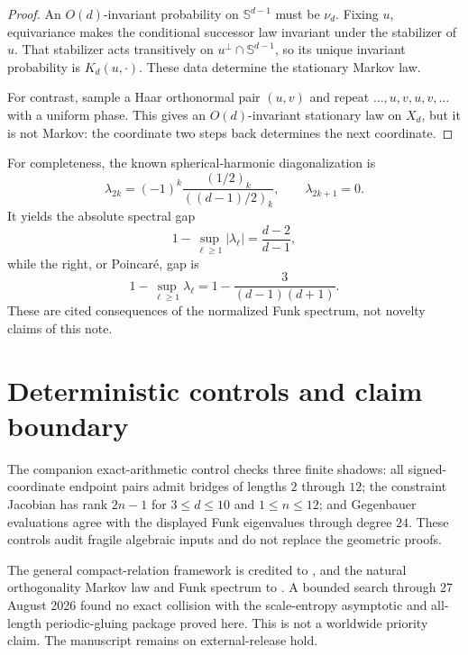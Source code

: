 \documentclass[11pt,a4paper]{amsart}
\theoremstyle{definition}
\theoremstyle{remark}
\newcommand{\Sphere}{\mathbb S}
\begin{document}
\begin{proof}
An $O(d)$-invariant probability on $\Sphere^{d-1}$ must be $\nu_d$.  Fixing
$u$, equivariance makes the conditional successor law invariant under the
stabilizer of $u$.  That stabilizer acts transitively on
$u^\perp\cap\Sphere^{d-1}$, so its unique invariant probability is
$K_d(u,\cdot)$.  These data determine the stationary Markov law.

For contrast, sample a Haar orthonormal pair $(u,v)$ and repeat
$\ldots,u,v,u,v,\ldots$ with a uniform phase.  This gives an $O(d)$-invariant
stationary law on $X_d$, but it is not Markov: the coordinate two steps back
determines the next coordinate.
\end{proof}

For completeness, the known spherical-harmonic diagonalization is
\[
 \lambda_{2k}=(-1)^k\frac{(1/2)_k}{((d-1)/2)_k},\qquad
 \lambda_{2k+1}=0.
\]
It yields the absolute spectral gap
\[
 1-\sup_{\ell\geq1}|\lambda_\ell|=\frac{d-2}{d-1},
\]
while the right, or Poincar\'e, gap is
\[
 1-\sup_{\ell\geq1}\lambda_\ell
 =1-\frac{3}{(d-1)(d+1)}.
\]
These are cited consequences of the normalized Funk spectrum, not novelty
claims of this note.

\section{Deterministic controls and claim boundary}

The companion exact-arithmetic control checks three finite shadows: all
signed-coordinate endpoint pairs admit bridges of lengths $2$ through $12$;
the constraint Jacobian has rank $2n-1$ for $3\leq d\leq10$ and
$1\leq n\leq12$; and Gegenbauer evaluations agree with the displayed Funk
eigenvalues through degree $24$.  These controls audit fragile algebraic
inputs and do not replace the geometric proofs.

The general compact-relation framework is credited to
\citet{Friedland1991,Pessil2025}, and the natural orthogonality Markov law and
Funk spectrum to \citet{KunszentiEtAl2024}.  A bounded search through 27
August 2026 found no exact collision with the scale-entropy asymptotic and
all-length periodic-gluing package proved here.  This is not a worldwide
priority claim.  The manuscript remains on external-release hold.



\end{document}
